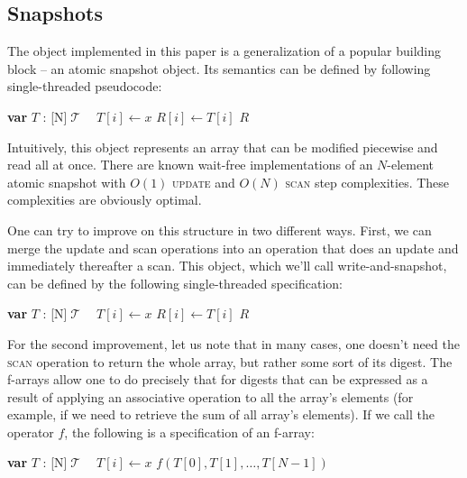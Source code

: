 \documentclass[a4paper,11pt]{article}
\def\T{\ensuremath{\operatorname{\mathcal{T}}}\text{ }}
\newcommand{\fn}[1]{\textsc{#1}}
\newcommand{\var}[2]{\textbf{var }#1 : #2}
\newcommand{\arrayspec}[1]{\text{array}[#1]\text{ of }}
\begin{document}
\subsection{Snapshots}

The object implemented in this paper is a generalization of a popular building block -- an atomic snapshot
object\cite{snapshot-idea}. Its semantics can be defined by following single-threaded pseudocode:

\begin{algorithmic}[1]
	\State\var{$T$}{\arrayspec{N}$\T$}
	\State $T[i] \gets x$
\EndFunction
{}
		\State $R[i] \gets T[i]$
	\EndFor
	\State\Return $R$
\EndFunction
\end{algorithmic}

Intuitively, this object represents an array that can be modified piecewise and read all at once.
There are known wait-free implementations of an $N$-element atomic snapshot with $O(1)$ \fn{update} and $O(N)$ \fn{scan} step complexities\cite{snapshot-impl}. These complexities are obviously
optimal.

One can try to improve on this structure in two different ways. First, we can merge the update and scan operations
into an operation that does an update and immediately thereafter a scan. This object, which we'll call write-and-snapshot\cite{write-and-snap}, can be defined by the following single-threaded specification:

\begin{algorithmic}[1]
	\State\var{$T$}{\arrayspec{N}$\T$}
	\State $T[i] \gets x$
		\State $R[i] \gets T[i]$
	\EndFor
	\State\Return $R$
\EndFunction
\end{algorithmic}

For the second improvement, let us note that in many cases, one doesn't need the \fn{scan} operation to return the whole array, but rather some sort of its digest. The f-arrays\cite{f-array} allow one to do precisely that for digests that can be expressed as
a result of applying an associative operation to all the array's elements (for example, if we need to retrieve the sum of all array's elements). If we call the operator $f$, the following is a specification of an f-array:

\begin{algorithmic}[1]
	\State\var{$T$}{\arrayspec{N}$\T$}
	\State $T[i] \gets x$
\EndFunction
{}
	\State\Return $f(T[0], T[1], \ldots, T[N-1])$
\EndFunction
\end{algorithmic}
\end{document}
